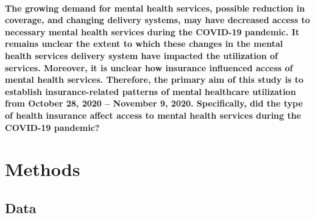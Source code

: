 \documentclass[
  12pt,
]{article}
\begin{document}
\hypertarget{the-growing-demand-for-mental-health-services-possible-reduction-in-coverage-and-changing-delivery-systems-may-have-decreased-access-to-necessary-mental-health-services-during-the-covid-19-pandemic.-it-remains-unclear-the-extent-to-which-these-changes-in-the-mental-health-services-delivery-system-have-impacted-the-utilization-of-services.-moreover-it-is-unclear-how-insurance-influenced-access-of-mental-health-services.-therefore-the-primary-aim-of-this-study-is-to-establish-insurance-related-patterns-of-mental-healthcare-utilization-from-october-28-2020-november-9-2020.-specifically-did-the-type-of-health-insurance-affect-access-to-mental-health-services-during-the-covid-19-pandemic}{%
\paragraph{The growing demand for mental health services, possible
reduction in coverage, and changing delivery systems, may have decreased
access to necessary mental health services during the COVID-19 pandemic.
It remains unclear the extent to which these changes in the mental
health services delivery system have impacted the utilization of
services. Moreover, it is unclear how insurance influenced access of
mental health services. Therefore, the primary aim of this study is to
establish insurance-related patterns of mental healthcare utilization
from October 28, 2020 -- November 9, 2020. Specifically, did the type of
health insurance affect access to mental health services during the
COVID-19
pandemic?}\label{the-growing-demand-for-mental-health-services-possible-reduction-in-coverage-and-changing-delivery-systems-may-have-decreased-access-to-necessary-mental-health-services-during-the-covid-19-pandemic.-it-remains-unclear-the-extent-to-which-these-changes-in-the-mental-health-services-delivery-system-have-impacted-the-utilization-of-services.-moreover-it-is-unclear-how-insurance-influenced-access-of-mental-health-services.-therefore-the-primary-aim-of-this-study-is-to-establish-insurance-related-patterns-of-mental-healthcare-utilization-from-october-28-2020-november-9-2020.-specifically-did-the-type-of-health-insurance-affect-access-to-mental-health-services-during-the-covid-19-pandemic}}

\hypertarget{methods}{%
\section{Methods}\label{methods}}

\hypertarget{data}{%
\subsection{Data}\label{data}}
\end{document}
